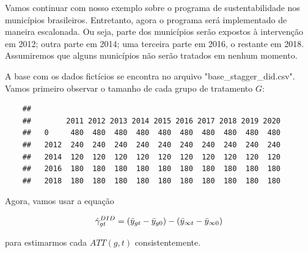 \documentclass[portugues]{article}
\newenvironment{Shaded}{\begin{snugshade}}{\end{snugshade}}
\newcommand{\AttributeTok}[1]{\textcolor[rgb]{0.13,0.29,0.53}{#1}}
\newcommand{\DecValTok}[1]{\textcolor[rgb]{0.00,0.00,0.81}{#1}}
\newcommand{\FunctionTok}[1]{\textcolor[rgb]{0.13,0.29,0.53}{\textbf{#1}}}
\newcommand{\NormalTok}[1]{#1}
\newcommand{\OtherTok}[1]{\textcolor[rgb]{0.56,0.35,0.01}{#1}}
\newcommand{\SpecialCharTok}[1]{\textcolor[rgb]{0.81,0.36,0.00}{\textbf{#1}}}
\begin{document}
\begin{boxA}
    Vamos continuar com nosso exemplo sobre o programa de sustentabilidade nos municípios brasileiros. Entretanto, agora o programa será implementado de maneira escalonada. Ou seja, parte dos municípios serão expostos à intervenção em 2012; outra parte em 2014; uma terceira parte em 2016, o restante em 2018. Assumiremos que alguns municípios não serão tratados em nenhum momento.

    A base com os dados fictícios se encontra no arquivo "base\_stagger\_did.csv". Vamos primeiro observar o tamanho de cada grupo de tratamento $G$:

    \begin{Shaded}
    \end{Shaded}

    \begin{verbatim}
    ##       
    ##        2011 2012 2013 2014 2015 2016 2017 2018 2019 2020
    ##   0     480  480  480  480  480  480  480  480  480  480
    ##   2012  240  240  240  240  240  240  240  240  240  240
    ##   2014  120  120  120  120  120  120  120  120  120  120
    ##   2016  180  180  180  180  180  180  180  180  180  180
    ##   2018  180  180  180  180  180  180  180  180  180  180
    \end{verbatim}

    Agora, vamos usar a equação

    $$ \hat{\gamma}^{DID}_{gt} = (\Bar{y}_{gt} - \Bar{y}_{g0}) - (\Bar{y}_{\infty t} - \Bar{y}_{\infty 0}) $$

    \noindent para estimarmos cada $ATT(g,t)$ consistentemente.

    \begin{Shaded}
\end{Shaded}
\end{boxA}
\end{document}
